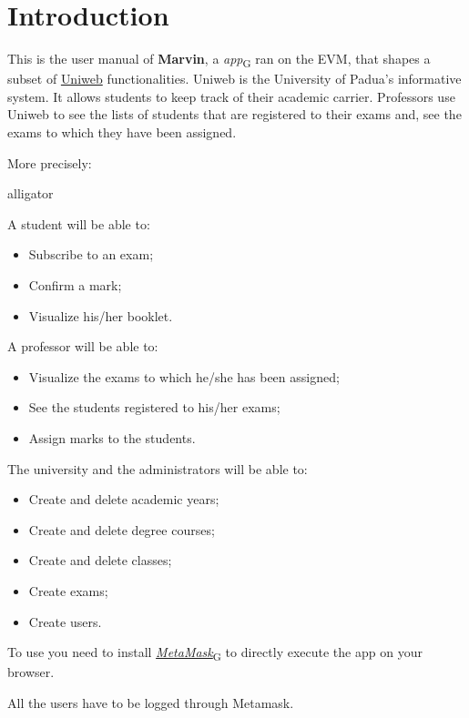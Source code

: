 \section{Introduction}
This is the user manual of \textbf{Marvin}, a \emph{\DH app}\textsubscript{G} ran on the EVM, that shapes a subset of \href{www.uniweb.unipd.it}{Uniweb} functionalities. Uniweb is the University of Padua's informative system.
It allows students to keep track of their academic carrier. Professors use Uniweb to see the lists of students that are registered to their exams and, see the exams to which they have been assigned.

More precisely:
\begin{labeling}{alligator}
	\item A student will be able to:
	\begin{itemize}
		\item Subscribe to an exam;
		\item Confirm a mark;
		\item Visualize his/her booklet.
	\end{itemize}
	\item A professor will be able to:
	\begin{itemize}
		\item Visualize the exams to which he/she has been assigned;
		\item See the students registered to his/her exams;
		\item Assign marks to the students.
	\end{itemize}
	\item The university and the administrators will be able to:
	\begin{itemize}
		\item Create and delete academic years;
		\item Create and delete degree courses;
		\item Create and delete classes;
		\item Create exams;
		\item Create users.
	\end{itemize}
\end{labeling}

To use \project{} you need to install \emph{\href{https://metamask.io/}{MetaMask}}\textsubscript{G} to directly execute the \DH app on your browser.

All the users have to be logged through Metamask.